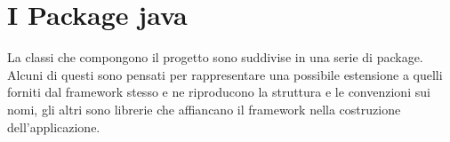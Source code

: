 \section{I Package java} 
\label{sec:sfrc_packages}
La classi che compongono il progetto sono suddivise in una serie di package. %
Alcuni di questi sono pensati per rappresentare una possibile estensione a quelli forniti dal framework stesso e ne riproducono la struttura e le convenzioni sui nomi, gli altri sono librerie che affiancano il framework nella costruzione dell'applicazione.